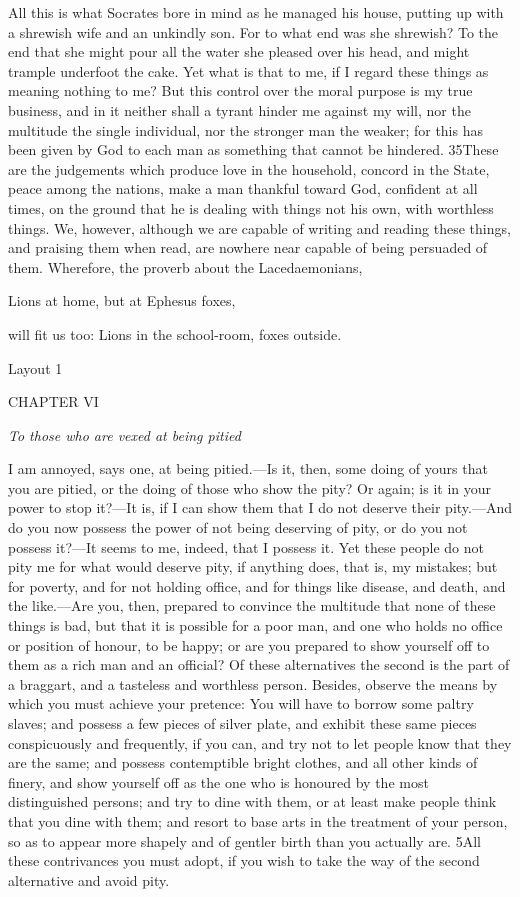 All this is what Socrates bore in mind as he managed his house, putting up with a shrewish wife and an unkindly son. For to what end was she shrewish? To the end that she might pour all the water she pleased over his head, and might trample underfoot the cake. Yet what is that to me, if I regard these things as meaning nothing to me? But this control over the moral purpose is my true business, and in it neither shall a tyrant hinder me against my will, nor the multitude the single individual, nor the stronger man the weaker; for this has been given by God to each man as something that cannot be hindered. 35These are the judgements which produce love in the household, concord in the State, peace among the nations, make a man thankful toward God, confident at all times, on the ground that he is dealing with things not his own, with worthless things. We, however, although we are capable of writing and reading these things, and praising them when read, are nowhere near capable of being persuaded of them. Wherefore, the proverb about the Lacedaemonians,

Lions at home, but at Ephesus foxes,

will fit us too: Lions in the school-room, foxes outside.



Layout 1

CHAPTER VI

\emph{To those who are vexed at being pitied}

I am annoyed, says one, at being pitied.—Is it, then, some doing of yours that you are pitied, or the doing of those who show the pity? Or again; is it in your power to stop it?—It is, if I can show them that I do not deserve their pity.—And do you now possess the power of not being deserving of pity, or do you not possess it?—It seems to me, indeed, that I possess it. Yet these people do not pity me for what would deserve pity, if anything does, that is, my mistakes; but for poverty, and for not holding office, and for things like disease, and death, and the like.—Are you, then, prepared to convince the multitude that none of these things is bad, but that it is possible for a poor man, and one who holds no office or position of honour, to be happy; or are you prepared to show yourself off to them as a rich man and an official? Of these alternatives the second is the part of a braggart, and a tasteless and worthless person. Besides, observe the means by which you must achieve your pretence: You will have to borrow some paltry slaves; and possess a few pieces of silver plate, and exhibit these same pieces conspicuously and frequently, if you can, and try not to let people know that they are the same; and possess contemptible bright clothes, and all other kinds of finery, and show yourself off as the one who is honoured by the most distinguished persons; and try to dine with them, or at least make people think that you dine with them; and resort to base arts in the treatment of your person, so as to appear more shapely and of gentler birth than you actually are. 5All these contrivances you must adopt, if you wish to take the way of the second alternative and avoid pity.

